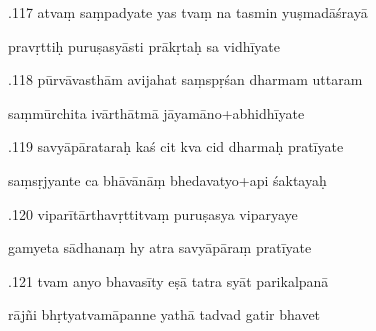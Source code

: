 \documentclass[article,12pt,a4paper]{memoir}%
\newcounter{parCount}
\begin{document}
	  
	  \pstart {}.117 atvaṃ saṃpadyate yas tvaṃ na tasmin yuṣmadāśrayā 
	{}
	\pend%
      

	  
	  \pstart \leavevmode%
	pravṛttiḥ puruṣasyāsti prākṛtaḥ sa vidhīyate 
	{}
	\pend%
      

	  
	  \pstart {}.118 pūrvāvasthām avijahat saṃspṛśan dharmam uttaram 
	{}
	\pend%
      

	  
	  \pstart \leavevmode%
	saṃmūrchita ivārthātmā jāyamāno+abhidhīyate 
	{}
	\pend%
      

	  
	  \pstart {}.119 savyāpārataraḥ kaś cit kva cid dharmaḥ pratīyate 
	{}
	\pend%
      

	  
	  \pstart \leavevmode%
	saṃsṛjyante ca bhāvānāṃ bhedavatyo+api śaktayaḥ 
	{}
	\pend%
      

	  
	  \pstart {}.120 viparītārthavṛttitvaṃ puruṣasya viparyaye 
	{}
	\pend%
      

	  
	  \pstart \leavevmode%
	gamyeta sādhanaṃ hy atra savyāpāraṃ pratīyate 
	{}
	\pend%
      

	  
	  \pstart {}.121 tvam anyo bhavasīty eṣā tatra syāt parikalpanā 
	{}
	\pend%
      

	  
	  \pstart \leavevmode%
	rājñi bhṛtyatvamāpanne yathā tadvad gatir bhavet 
	{}
	\pend%
      
\end{document}
